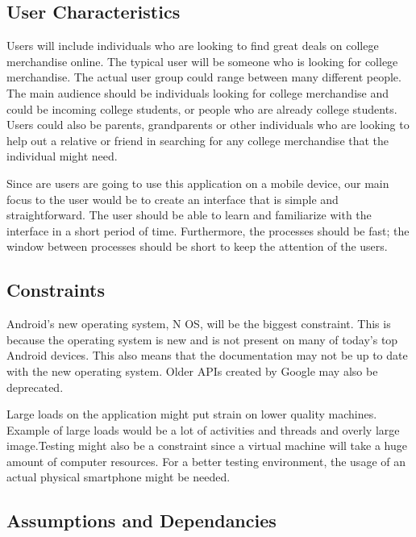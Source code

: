 \documentclass[journal,compsoc, 10pt, draftclsnofoot, onecolumn]{IEEEtran}
\begin{document}
\subsection{User Characteristics}

Users will include individuals who are looking to find great deals on college 
merchandise online. The typical user will be someone who is looking for college 
merchandise. The actual user group could range between many different people. 
The main audience should be individuals looking for college merchandise and 
could be incoming college students, or people who are already college students. 
Users could also be parents, grandparents or other individuals who are looking 
to help out a relative or friend in searching for any college merchandise that 
the individual might need. \newline

Since are users are going to use this application on  a mobile device, 
our main focus to the user would be to create an interface that is simple
 and straightforward. The user should be able to learn and familiarize with the interface
 in a short period of time. Furthermore, the processes should be fast; the 
window between processes should be short to keep the attention of the users.

\subsection{Constraints}

Android's new operating system, N OS, will be the biggest constraint. This is 
because the operating system is new and is not present on many of today's top 
Android devices. This also means that the documentation may not be up to date 
with the new operating system. Older APIs created by Google may also be
 deprecated.\newline

Large loads on the application might put strain on lower quality machines. 
Example of large loads would be a lot of activities and threads and overly 
large image.Testing might also be a constraint since a virtual machine will take a huge 
amount of computer resources. For a better testing environment, the usage of an 
actual physical smartphone might be needed.

\subsection{Assumptions and Dependancies}
\end{document}
